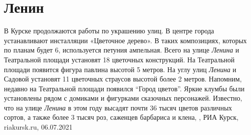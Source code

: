  
 
 
 
 
\chapter{Ленин}


В Курске продолжаются работы по украшению улиц. В центре города устанавливают
инсталляции «Цветочное дерево». В таких композициях, которых по планам будет 6,
используется петуния ампельная.  Всего на улице \emph{Ленина} и Театральной
площади установят 18 цветочных конструкций. На Театральной площади появится
фигура павлина высотой 5 метров. На углу улиц \emph{Ленина} и Садовой установят
11 цветочных страусов высотой более 2 метров.  Напомним, недавно на Театральной
площади появился \enquote{Город цветов}. Яркие клумбы были установлены рядом с
домиками и фигурками сказочных персонажей.  Известно, что на улице
\emph{Ленина} в этом году высадят почти 36 тысяч цветов различных сортов, а
также более 3 тысяч роз, саженцев барбариса и клена,
, РИА Курск, riakursk.ru, 06.07.2021

